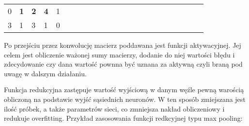\begin{table}[h]
\begin{tabular}{lllllllllllllllllllllll}
\multicolumn{1}{|l|}{0} & \multicolumn{1}{l|}{\textbf{1}} & \multicolumn{1}{l|}{\textbf{2}} & \multicolumn{1}{l|}{\textbf{4}} & \multicolumn{1}{l|}{1} &  &  &                       &                         &                         &                         &  &  &                       &                         &                        &  &  &                       &                        &                         &  &  \\ \cline{1-5}
\multicolumn{1}{|l|}{3} & \multicolumn{1}{l|}{1}          & \multicolumn{1}{l|}{3}          & \multicolumn{1}{l|}{1}          & \multicolumn{1}{l|}{0} &  &  &                       &                         &                         &                         &  &  &                       &                         &                        &  &  &                       &                        &                         &  &  \\ \cline{1-5}
\end{tabular}
\end{table}

Po przejściu przez konwolucję macierz poddawana jest funkcji aktywacyjnej. Jej celem jest obliczenie ważonej sumy macierzy, dodanie do niej wartości błędu i zdecydowanie czy dana wartość pownna być uznana za aktywną czyli braną pod uwagę w dalszym działaniu.

Funkcja redukcyjna zastępuje wartość wyjściową w danym węźle pewną warością obliczoną na podstawie wyjść sąsiednich neuronów. W ten sposób zmiejszana jest ilość próbek, a także parametrów sieci, co zmniejsza nakład obliczeniowy i redukuje overfitting. Przykład zasosowania funkcji redkcyjnej typu max pooling:

